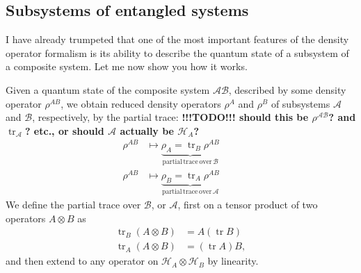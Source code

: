 \documentclass{article}
\begin{document}
\hypertarget{subsystems-of-entangled-systems}{%
\subsection{Subsystems of entangled systems}\label{subsystems-of-entangled-systems}}

I have already trumpeted that one of the most important features of the density operator formalism is its ability to describe the quantum state of a subsystem of a composite system.
Let me now show you how it works.

Given a quantum state of the composite system \(\mathcal{AB}\), described by some density operator \(\rho^{AB}\), we obtain reduced density operators \(\rho^A\) and \(\rho^B\) of subsystems \(\mathcal{A}\) and \(\mathcal{B}\), respectively, by the partial trace:
\textbf{!!!TODO!!! should this be \(\rho^{\mathcal{A}\mathcal{B}}\)? and \(\operatorname{tr}_{\mathcal{A}}\)? etc., or should \(\mathcal{A}\) actually be \(\mathcal{H}_A\)?}
\[
  \begin{aligned}
    \rho^{AB}
    &\mapsto
    \underbrace{\rho_A=\operatorname{tr}_B\rho^{AB}}_{\mathrm{partial\,trace\,over}\,\mathcal{B}}\qquad
  \\\rho^{AB}
    &\mapsto
    \underbrace{\rho_B=\operatorname{tr}_A\rho^{AB}}_{\mathrm{partial\,trace\,over}\,\mathcal{A}}
  \end{aligned}
\]
We define the partial trace over \(\mathcal{B}\), or \(\mathcal{A}\), first on a tensor product of two operators \(A\otimes B\) as
\[
  \begin{aligned}
    \operatorname{tr}_B (A\otimes B)
    &= A(\operatorname{tr}B)
  \\\operatorname{tr}_A (A\otimes B)
    &= (\operatorname{tr}A) B,
  \end{aligned}
\]
and then extend to any operator on \(\mathcal{H}_A\otimes\mathcal{H}_B\) by linearity.
\end{document}
